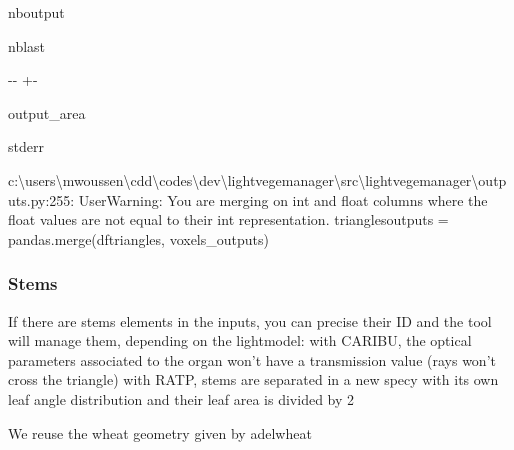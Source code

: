 \documentclass[letterpaper,10pt,english]{sphinxmanual}
\begin{document}
\begin{sphinxuseclass}{nboutput}
\begin{sphinxuseclass}{nblast}
{

\kern-\sphinxverbatimsmallskipamount\kern-\baselineskip
\kern+\FrameHeightAdjust\kern-\fboxrule
\vspace{\nbsphinxcodecellspacing}

\begin{sphinxuseclass}{output_area}
\begin{sphinxuseclass}{stderr}


\begin{sphinxVerbatim}[commandchars=\\\{\}]
c:\textbackslash{}users\textbackslash{}mwoussen\textbackslash{}cdd\textbackslash{}codes\textbackslash{}dev\textbackslash{}lightvegemanager\textbackslash{}src\textbackslash{}lightvegemanager\textbackslash{}outputs.py:255: UserWarning: You are merging on int and float columns where the float values are not equal to their int representation.
  trianglesoutputs = pandas.merge(dftriangles, voxels\_outputs)
\end{sphinxVerbatim}



\end{sphinxuseclass}
\end{sphinxuseclass}
}

\end{sphinxuseclass}
\end{sphinxuseclass}

\subsubsection{Stems}
\label{\detokenize{input_scenes:Stems}}
\sphinxAtStartPar
If there are stems elements in the inputs, you can precise their ID and the tool will manage them, depending on the lightmodel: \sphinxhyphen{} with CARIBU, the optical parameters associated to the organ won’t have a transmission value (rays won’t cross the triangle) \sphinxhyphen{} with RATP, stems are separated in a new specy with its own leaf angle distribution and their leaf area is divided by 2

\sphinxAtStartPar
We reuse the wheat geometry given by adelwheat
\end{document}
